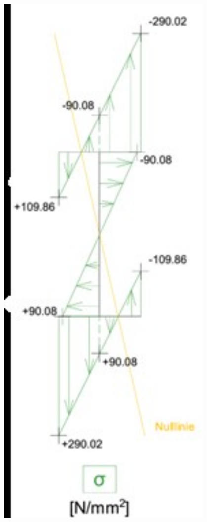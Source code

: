 \begin{center}
	\includegraphics[width=0.8\textwidth]{papers/balken/images/teil1/Nulllinie2.jpg}
\end{center}
\label{Die Abbildung zeigt den Spannungsverlauf und die Nullinie bei einer zweiaxialen Beanspruchung eines I-Förmigen Querschnitts.}


